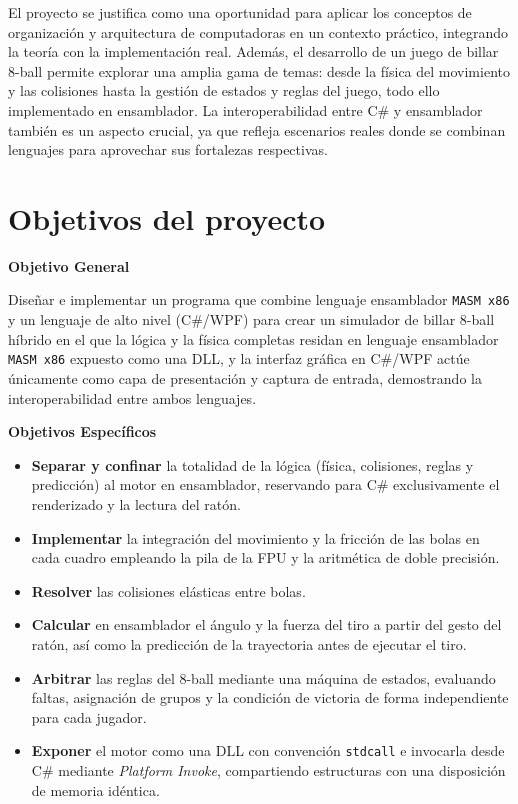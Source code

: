 \documentclass[a4paper,12pt]{article}
\begin{document}
El proyecto se justifica como una oportunidad para aplicar los conceptos de organización y arquitectura de computadoras en un contexto práctico, integrando la teoría con la implementación real. Además, el desarrollo de un juego de billar 8-ball permite explorar una amplia gama de temas: desde la física del movimiento y las colisiones hasta la gestión de estados y reglas del juego, todo ello implementado en ensamblador. La interoperabilidad entre C\# y ensamblador también es un aspecto crucial, ya que refleja escenarios reales donde se combinan lenguajes para aprovechar sus fortalezas respectivas.

\newpage
\section{Objetivos del proyecto}
\textbf{Objetivo General}

Diseñar e implementar un programa que combine lenguaje ensamblador \texttt{MASM x86} y un lenguaje de alto nivel (C\#/WPF) para crear un simulador de billar 8-ball híbrido en el que la lógica y la física completas residan en lenguaje ensamblador \texttt{MASM x86} expuesto como una DLL, y la interfaz gráfica en C\#/WPF actúe únicamente como capa de presentación y captura de entrada, demostrando la interoperabilidad entre ambos lenguajes.

\textbf{Objetivos Específicos}
\begin{itemize}
    \item \textbf{Separar y confinar} la totalidad de la lógica (física, colisiones, reglas y predicción) al motor en ensamblador, reservando para C\# exclusivamente el renderizado y la lectura del ratón.
    \item \textbf{Implementar} la integración del movimiento y la fricción de las bolas en cada cuadro empleando la pila de la FPU y la aritmética de doble precisión.
    \item \textbf{Resolver} las colisiones elásticas entre bolas.
    \item \textbf{Calcular} en ensamblador el ángulo y la fuerza del tiro a partir del gesto del ratón, así como la predicción de la trayectoria antes de ejecutar el tiro.
    \item \textbf{Arbitrar} las reglas del 8-ball mediante una máquina de estados, evaluando faltas, asignación de grupos y la condición de victoria de forma independiente para cada jugador.
    \item \textbf{Exponer} el motor como una DLL con convención \texttt{stdcall} e invocarla desde C\# mediante \textit{Platform Invoke}, compartiendo estructuras con una disposición de memoria idéntica.
\end{itemize}
\end{document}
